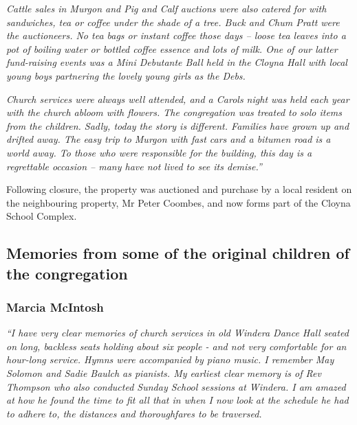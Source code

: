 \emph{Cattle sales in Murgon and Pig and Calf auctions were also catered for with sandwiches, tea or coffee under the shade of a tree. Buck and Chum Pratt were the auctioneers. No tea bags or instant coffee those days -- loose tea leaves into a pot of boiling water or bottled coffee essence and lots of milk. One of our latter fund-raising events was a Mini Debutante Ball held in the Cloyna Hall with local young boys partnering the lovely young girls as the Debs.}



\emph{Church services were always well attended, and a Carols night was held each year with the church abloom with flowers. The congregation was treated to solo items from the children. Sadly, today the story is different. Families have grown up and drifted away. The easy trip to Murgon with fast cars and a bitumen road is a world away. To those who were responsible for the building, this day is a regrettable occasion -- many have not lived to see its demise.''}



Following closure, the property was auctioned and purchase by a local resident on the neighbouring property, Mr Peter Coombes, and now forms part of the Cloyna School Complex.



\subsection{Memories from some of the original children of the congregation}



\subsubsection{Marcia McIntosh}



\emph{``I have very clear memories of church services in old Windera Dance Hall seated on long, backless seats holding about six people - and not very comfortable for an hour-long service. Hymns were accompanied by piano music. I remember May Solomon and Sadie Baulch as pianists. My earliest clear memory is of Rev Thompson who also conducted Sunday School sessions at Windera. I am amazed at how he found the time to fit all that in when I now look at the schedule he had to adhere to, the distances and thoroughfares to be traversed.}



